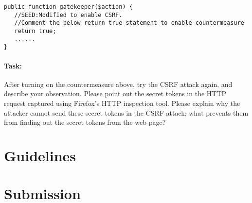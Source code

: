 \begin{lstlisting}
public function gatekeeper($action) {
   //SEED:Modified to enable CSRF. 
   //Comment the below return true statement to enable countermeasure
   return true;
   ......
}
\end{lstlisting}


\paragraph{Task:}
After turning on the countermeasure above, try the CSRF attack again, 
and describe your observation. Please point out the secret tokens in the 
HTTP request captured using Firefox's HTTP inspection tool.
Please explain why
the attacker cannot send these secret tokens in the CSRF attack; what
prevents them from finding out the secret tokens from the web page?   



\section{Guidelines}





\section{Submission}

\seedsubmission







